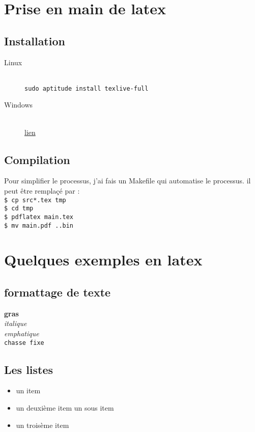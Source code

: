 \section{Prise en main de latex}
\subsection{Installation}
	\begin{description}
		\item[Linux]\\
			\texttt{sudo aptitude install texlive-full}
		\item[Windows]\\
			\href{http://mirror.ctan.org/systems/texlive/tlnet/install-tl.zip}{lien}
	\end{description}

\subsection{Compilation}
	Pour simplifier le processus, j'ai fais un Makefile qui automatise le processus.
	il peut être remplaçé par :\\
		\texttt{\$ cp src\/*.tex tmp\/}\\
		\texttt{\$ cd tmp\/}\\		
		\texttt{\$ pdflatex main.tex}\\
		\texttt{\$ mv main.pdf ..\/bin\/}\\

\section{Quelques exemples en latex}
\subsection{formattage de texte}

	\textbf{gras}\\
	\textit{italique}\\
	\emph{emphatique}\\
	\texttt{chasse fixe}\\

\subsection{Les listes}
		
	\begin{itemize}
	\item un item
	\item un deuxième item
		\subitem un sous item
	\item un troisème item
	\end{itemize}
